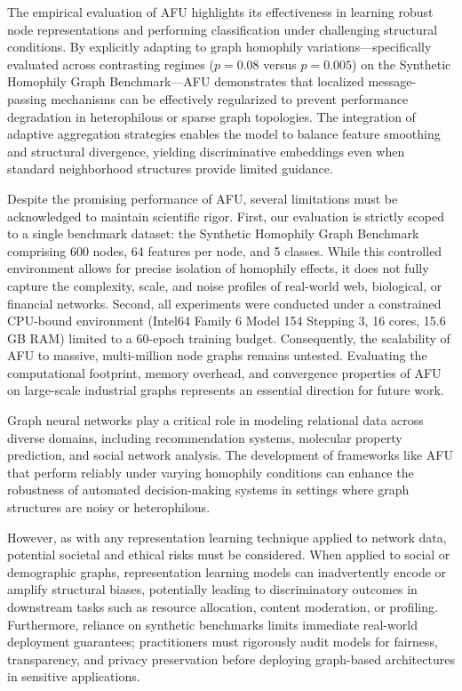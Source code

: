 \documentclass[10pt,twocolumn]{article}
\begin{document}
The empirical evaluation of \textsc{AFU} highlights its effectiveness in learning robust node representations and performing classification under challenging structural conditions. By explicitly adapting to graph homophily variations—specifically evaluated across contrasting regimes ($p=0.08$ versus $p=0.005$) on the Synthetic Homophily Graph Benchmark—\textsc{AFU} demonstrates that localized message-passing mechanisms can be effectively regularized to prevent performance degradation in heterophilous or sparse graph topologies. The integration of adaptive aggregation strategies enables the model to balance feature smoothing and structural divergence, yielding discriminative embeddings even when standard neighborhood structures provide limited guidance.


Despite the promising performance of \textsc{AFU}, several limitations must be acknowledged to maintain scientific rigor. First, our evaluation is strictly scoped to a single benchmark dataset: the Synthetic Homophily Graph Benchmark comprising 600 nodes, 64 features per node, and 5 classes. While this controlled environment allows for precise isolation of homophily effects, it does not fully capture the complexity, scale, and noise profiles of real-world web, biological, or financial networks. Second, all experiments were conducted under a constrained CPU-bound environment (Intel64 Family 6 Model 154 Stepping 3, 16 cores, 15.6 GB RAM) limited to a 60-epoch training budget. Consequently, the scalability of \textsc{AFU} to massive, multi-million node graphs remains untested. Evaluating the computational footprint, memory overhead, and convergence properties of \textsc{AFU} on large-scale industrial graphs represents an essential direction for future work.


Graph neural networks play a critical role in modeling relational data across diverse domains, including recommendation systems, molecular property prediction, and social network analysis. The development of frameworks like \textsc{AFU} that perform reliably under varying homophily conditions can enhance the robustness of automated decision-making systems in settings where graph structures are noisy or heterophilous. 

However, as with any representation learning technique applied to network data, potential societal and ethical risks must be considered. When applied to social or demographic graphs, representation learning models can inadvertently encode or amplify structural biases, potentially leading to discriminatory outcomes in downstream tasks such as resource allocation, content moderation, or profiling. Furthermore, reliance on synthetic benchmarks limits immediate real-world deployment guarantees; practitioners must rigorously audit models for fairness, transparency, and privacy preservation before deploying graph-based architectures in sensitive applications.
\end{document}
